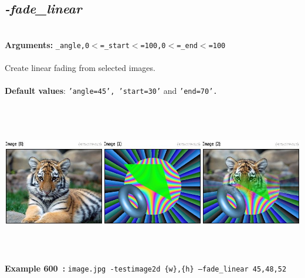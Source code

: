 \documentclass[a4paper,11pt,twoside]{book}
\begin{document}
\subsection{\emph{-fade\_linear} }\vspace*{-0.5em}
~\\\textbf{Arguments: } 
{\small \texttt{\_angle,0$<$=\_start$<$=100,0$<$=\_end$<$=100}}\\~\\
Create linear fading from selected images.
~\\~\\\textbf{Default values}: {\small \texttt{'angle=45', 'start=30'} and \texttt{'end=70'.}}
\begin{center}\includegraphics[keepaspectratio=true,height=7cm,width=\textwidth]{img/gmic_def600.jpg}\\
{\footnotesize \textbf{Example 600~:} \texttt{image.jpg -testimage2d \{w\},\{h\} --fade\_linear 45,48,52}}
\end{center}
\end{document}
